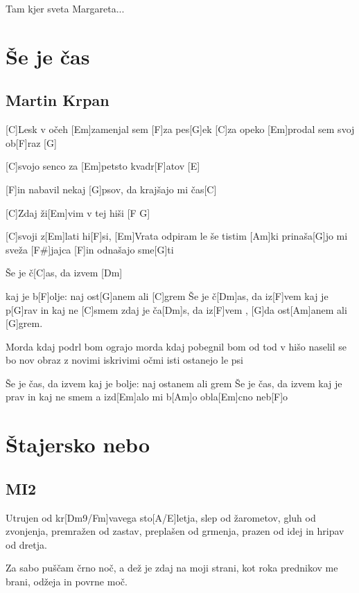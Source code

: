 \documentclass[a4paper,12pt]{article}
\begin{document}
\begin{multicols}{2}
\begin{guitar}
Tam kjer sveta Margareta...

\end{guitar}
\section{Še je čas}
\subsection*{Martin Krpan}
\begin{guitar}

[C]Lesk v očeh [Em]zamenjal sem [F]za pes[G]ek 
[C]za opeko [Em]prodal sem svoj ob[F]raz [G]

[C]svojo senco za [Em]petsto kvadr[F]atov [E]

[F]in nabavil nekaj [G]psov, da krajšajo mi čas[C] 


[C]Zdaj ži[Em]vim v tej hiši [F G]

[C]svoji z[Em]lati hi[F]si, 
[Em]Vrata odpiram le še tistim 
[Am]ki prinaša[G]jo mi sveža [F#]jajca 
[F]in odnašajo sme[G]ti 


Še je č[C]as, da izvem [Dm]

kaj je b[F]olje: naj ost[G]anem ali [C]grem 
Še je č[Dm]as, da iz[F]vem 
kaj je p[G]rav in kaj ne [C]smem 
zdaj je ča[Dm]s, da iz[F]vem ,
[G]da ost[Am]anem ali [G]grem. 


Morda kdaj podrl bom ograjo 
morda kdaj pobegnil bom od tod 
v hišo naselil se bo nov obraz 
z novimi iskrivimi očmi 
isti ostanejo le psi 


Še je čas, da izvem 
kaj je bolje: naj ostanem ali grem 
Še je čas, da izvem 
kaj je prav in kaj ne smem 
a izd[Em]alo mi b[Am]o obla[Em]cno neb[F]o 

\end{guitar}
\section{Štajersko nebo}
\subsection*{MI2}
\begin{guitar}
[D9/F#]Utrujen od kr[Dm9/Fm]vavega sto[A/E]letja,
slep od žarometov, gluh od zvonjenja,
premražen od zastav, preplašen od grmenja,
prazen od idej in hripav od dretja.

Za sabo puščam črno noč,
a dež je zdaj na moji strani,
kot roka prednikov me brani,
odžeja in povrne moč.


\end{guitar}
\end{multicols}
\end{document}
